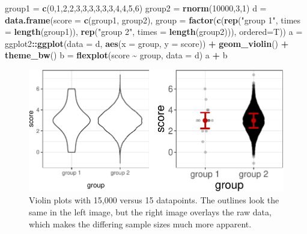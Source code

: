 \documentclass[
  man]{apa6}
\newenvironment{Shaded}{\begin{snugshade}}{\end{snugshade}}
\newcommand{\DataTypeTok}[1]{\textcolor[rgb]{0.13,0.29,0.53}{#1}}
\newcommand{\DecValTok}[1]{\textcolor[rgb]{0.00,0.00,0.81}{#1}}
\newcommand{\KeywordTok}[1]{\textcolor[rgb]{0.13,0.29,0.53}{\textbf{#1}}}
\newcommand{\NormalTok}[1]{#1}
\newcommand{\OperatorTok}[1]{\textcolor[rgb]{0.81,0.36,0.00}{\textbf{#1}}}
\newcommand{\StringTok}[1]{\textcolor[rgb]{0.31,0.60,0.02}{#1}}
\begin{document}
\begin{Shaded}
\begin{Highlighting}[]
\NormalTok{group1 =}\StringTok{ }\KeywordTok{c}\NormalTok{(}\DecValTok{0}\NormalTok{,}\DecValTok{1}\NormalTok{,}\DecValTok{2}\NormalTok{,}\DecValTok{2}\NormalTok{,}\DecValTok{3}\NormalTok{,}\DecValTok{3}\NormalTok{,}\DecValTok{3}\NormalTok{,}\DecValTok{3}\NormalTok{,}\DecValTok{3}\NormalTok{,}\DecValTok{3}\NormalTok{,}\DecValTok{4}\NormalTok{,}\DecValTok{4}\NormalTok{,}\DecValTok{5}\NormalTok{,}\DecValTok{6}\NormalTok{)}
\NormalTok{group2 =}\StringTok{ }\KeywordTok{rnorm}\NormalTok{(}\DecValTok{10000}\NormalTok{,}\DecValTok{3}\NormalTok{,}\DecValTok{1}\NormalTok{)}
\NormalTok{d =}\StringTok{ }\KeywordTok{data.frame}\NormalTok{(}\DataTypeTok{score =} \KeywordTok{c}\NormalTok{(group1, group2), }
               \DataTypeTok{group =} \KeywordTok{factor}\NormalTok{(}\KeywordTok{c}\NormalTok{(}\KeywordTok{rep}\NormalTok{(}\StringTok{"group 1"}\NormalTok{, }\DataTypeTok{times =} \KeywordTok{length}\NormalTok{(group1)), }
                       \KeywordTok{rep}\NormalTok{(}\StringTok{"group 2"}\NormalTok{, }\DataTypeTok{times =} \KeywordTok{length}\NormalTok{(group2))), }\DataTypeTok{ordered=}\NormalTok{T))}
\NormalTok{a =}\StringTok{ }\NormalTok{ggplot2}\OperatorTok{::}\KeywordTok{ggplot}\NormalTok{(}\DataTypeTok{data =}\NormalTok{ d, }\KeywordTok{aes}\NormalTok{(}\DataTypeTok{x =}\NormalTok{ group, }\DataTypeTok{y =}\NormalTok{ score)) }\OperatorTok{+}\StringTok{  }
\StringTok{  }\KeywordTok{geom\_violin}\NormalTok{() }\OperatorTok{+}\StringTok{ }\KeywordTok{theme\_bw}\NormalTok{()}
\NormalTok{b =}\StringTok{ }\KeywordTok{flexplot}\NormalTok{(score }\OperatorTok{\textasciitilde{}}\StringTok{ }\NormalTok{group, }\DataTypeTok{data =}\NormalTok{ d)}
\NormalTok{a }\OperatorTok{+}\StringTok{ }\NormalTok{b}
\end{Highlighting}
\end{Shaded}

\begin{figure}

{\centering \includegraphics[width=0.9\linewidth]{flexplot_psychmeth_files/figure-latex/raw-1} 

}

\caption{Violin plots with 15,000 versus 15 datapoints. The outlines look the same in the left image, but the right image overlays the raw data, which makes the differing sample sizes much more apparent. \label{fig:raw}}\label{fig:raw}
\end{figure}
\end{document}
